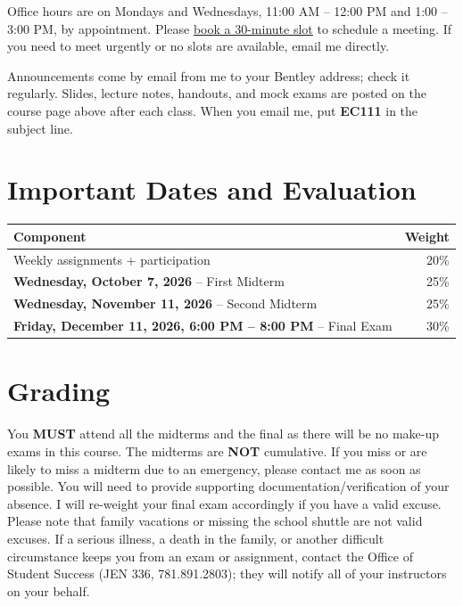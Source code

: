 \documentclass[11pt,letterpaper]{article}
\newcommand{\finaltime}{Friday, December 11, 2026, 6:00 PM -- 8:00 PM}
\newcommand{\finaltime}{Friday, December 11, 2026, 8:00 AM -- 10:00 AM}
\begin{document}
\vspace{0.3cm}

Office hours are on Mondays and Wednesdays, 11:00 AM -- 12:00 PM and 1:00 -- 3:00 PM, by appointment. Please \href{https://outlook.office.com/bookwithme/user/1c4e4f54e0f0493397e615b2c80a59c7@bentley.edu/meetingtype/rwPThvM0MkK5oGlK_t37nw2?bookingcode=17c9a7b2-69fa-4c48-85ea-ad404642334b&anonymous&ismsaljsauthenabled&ep=mlink}{book a 30-minute slot} to schedule a meeting. If you need to meet urgently or no slots are available, email me directly.

Announcements come by email from me to your Bentley address; check it regularly. Slides, lecture notes, handouts, and mock exams are posted on the course page above after each class. When you email me, put \textbf{EC111} in the subject line.

\section*{Important Dates and Evaluation}

\begin{tabularx}{\textwidth}{@{}Xr@{}}
\toprule
\textbf{Component} & \textbf{Weight} \\
\midrule
Weekly assignments + participation & 20\% \\
\textbf{Wednesday, October 7, 2026} – First Midterm & 25\% \\
\textbf{Wednesday, November 11, 2026} – Second Midterm & 25\% \\
\textbf{\finaltime} – Final Exam & 30\% \\
\bottomrule
\end{tabularx}

\section*{Grading}

You \textbf{MUST} attend all the midterms and the final as there will be no make-up exams in this course. The midterms are \textbf{NOT} cumulative. If you miss or are likely to miss a midterm due to an emergency, please contact me as soon as possible. You will need to provide supporting documentation/verification of your absence. I will re-weight your final exam accordingly if you have a valid excuse. Please note that family vacations or missing the school shuttle are not valid excuses. If a serious illness, a death in the family, or another difficult circumstance keeps you from an exam or assignment, contact the Office of Student Success (JEN 336, 781.891.2803); they will notify all of your instructors on your behalf.
\end{document}
